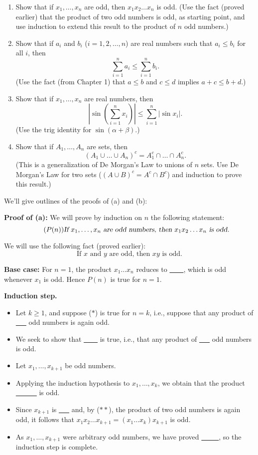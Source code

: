 \noindent
{}
\begin{enumerate}

\item{} 
Show that if $x_1,\dots,x_n$ are odd, then $x_1x_2\dots x_n$ is odd.
(Use the fact (proved earlier) that the product of two odd numbers is
odd, as starting point, and use induction to 
extend this result to the product of $n$ odd numbers.)

\item{}
Show that if $a_i$ and $b_i$ ($i=1,2,\dots,n$) are real numbers such that 
$a_i\le b_i$ for all $i$, then 
\[
\sum_{i=1}^na_i\le \sum_{i=1}^nb_i. 
\]
(Use the fact (from Chapter 1) that $a\le b$ and $c\le d$ implies
$a+c\le b+d$.)


\item
Show that if $x_1,\dots,x_n$ are real numbers, then
\[
\left|\sin\left(\sum_{i=1}^n x_i\right)\right|
\le \sum_{i=1}^n\left|\sin x_i\right|.
\]
(Use the trig identity for $\sin(\alpha+\beta)$.)  

\item{}
Show that if $A_1,\dots, A_n$ are sets, then 
\[
\left(A_1\cup \dots \cup A_n\right)^c
=A_1^c\cap\dots \cap A_n^c.
\]
(This is a generalization of De Morgan's Law to unions of $n$ sets.
Use De Morgan's Law for two sets ($(A\cup B)^c=A^c\cap B^c$) and induction
to prove this result.)


\end{enumerate}


We'll give outlines of the proofs of (a) and (b):
\bigskip

\textbf{Proof of (a):} We will prove by induction on $n$ the following statement: 
\[
\tag{$P(n)$}
\text{\slshape If $x_1,\dots,x_n$ are odd numbers, then 
$x_1x_2\dots x_n$ is odd.}
\]

We will use the following fact (proved earlier): 
\[
\tag{$**$}
\text{If $x$ and $y$ are odd, then $xy$ is odd.}
\]

\textbf{Base case:} For $n=1$, the product $x_1\dots x_n$ reduces to 
\underline{~~~~}, which  is odd whenever $x_1$ is odd. 
Hence $P(n)$ is true for $n=1$.

\textbf{Induction step.}
\begin{itemize}
\item Let $k\ge 1$, and suppose ($*$) is true for $n=k$, i.e.,
suppose that any product of \underline{~~~}  odd numbers is again odd.
\item
We seek to show that \underline{~~~~} is true, i.e., that any product of \underline{~~~}
odd numbers is odd. 
\item
Let $x_1,\dots,x_{k+1}$ be odd numbers. 
\item
Applying the induction hypothesis to $x_1,\dots,x_k$, we obtain that the
product \underline{~~~~~~} is odd. 
\item
Since $x_{k+1}$ is \underline{~~~}  and, by ($**$), the product of two odd numbers is
again odd, it follows that $x_1x_2\dots x_{k+1} = (x_1\dots x_k)x_{k+1}$
is odd.
\item
As $x_1,\dots,x_{k+1}$ were arbitrary odd numbers, we have proved
\underline{~~~~~}, so the induction step is complete.
\end{itemize}

